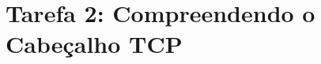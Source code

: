 \section*{Tarefa 2: Compreendendo o Cabeçalho TCP}

\begin{questions}
    
    
    
    
\end{questions}